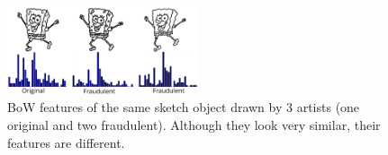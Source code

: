 \vspace{-4mm}
\begin{figure}[!htb]
\centering
\includegraphics[width = 0.5\textwidth]{images/HistogramsComparisonFraud3.png}
\vspace{-5mm}\caption{BoW features of the same sketch object drawn by 3 artists (one original and two fraudulent). Although they look very similar, their features are different.}
\label{HistogramsComparisonFraud} \vspace{-4mm}
\end{figure}





